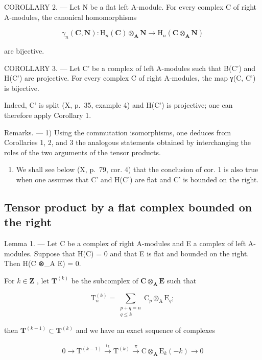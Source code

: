 COROLLARY 2. --- Let N be a flat left A-module. For every complex C of right A-modules, the canonical homomorphisms

\[
\gamma_ {n} (\mathbf {C}, \mathbf {N}): \mathrm{H} _ {n} (\mathbf {C}) \otimes_ {\mathbf {A}} \mathbf {N} \rightarrow \mathrm{H} _ {n} (\mathbf {C} \otimes_ {\mathbf {A}} \mathbf {N})
\]

are bijective.

COROLLARY 3. --- Let C' be a complex of left A-modules such that B(C') and H(C') are projective. For every complex C of right A-modules, the map γ(C, C') is bijective.

Indeed, C' is split (X, p.~35, example 4) and H(C') is projective; one can therefore apply Corollary 1.

Remarks. --- 1) Using the commutation isomorphisms, one deduces from Corollaries 1, 2, and 3 the analogous statements obtained by interchanging the roles of the two arguments of the tensor products.

\begin{enumerate}
\def\labelenumi{\arabic{enumi})}
\setcounter{enumi}{1}
\tightlist
\item
  We shall see below (X, p.~79, cor. 4) that the conclusion of cor. 1 is also true when one assumes that C' and H(C') are flat and C' is bounded on the right.
\end{enumerate}

\subsection{Tensor product by a flat complex bounded on the right}

Lemma 1. --- Let C be a complex of right A-modules and E a complex of left A-modules. Suppose that H(C) = 0 and that E is flat and bounded on the right. Then H(C ⊗\_A E) = 0.

For \(k \in \mathbf{Z}\) , let \(\mathbf{T}^{(k)}\) be the subcomplex of \(\mathbf{C} \otimes_{\mathbf{A}} \mathbf{E}\) such that

\[
\mathrm{T}_{n}^{(k)} = \sum_{\substack{p + q = n\\ q\leqslant k}}\mathrm{C}_{p}\otimes_{\mathrm{A}}\mathrm{E}_{q};
\]

then \(\mathbf{T}^{(k - 1)}\subset \mathbf{T}^{(k)}\) and we have an exact sequence of complexes

\[
0 \longrightarrow \mathrm{T} ^ {(k - 1)} \stackrel {i _ {k}} {\longrightarrow} \mathrm{T} ^ {(k)} \stackrel {\pi} {\longrightarrow} \mathrm{C} \otimes_ {\mathbf {A}} \mathrm{E} _ {k} (- k) \longrightarrow 0
\]


